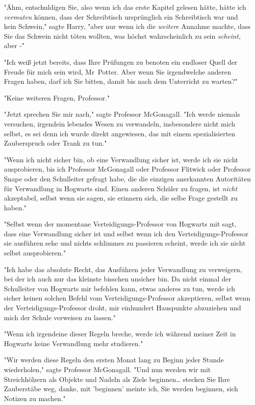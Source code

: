 {"Ähm, entschuldigen Sie, also wenn ich das erste Kapitel gelesen hätte, hätte ich \emph{vermuten} können, dass der Schreibtisch ursprünglich ein Schreibtisch war und kein Schwein," sagte Harry, "aber nur wenn ich die \emph{weitere} Annahme machte, dass Sie das Schwein nicht töten wollten, was höchst wahrscheinlich zu sein \emph{scheint,} aber -"

"Ich weiß jetzt bereits, dass Ihre Prüfungen zu benoten ein endloser Quell der Freude für mich sein wird, Mr~Potter. Aber wenn Sie irgendwelche anderen Fragen haben, darf ich Sie bitten, damit bis nach dem Unterricht zu warten?"

"Keine weiteren Fragen, Professor."

"Jetzt sprechen Sie mir nach," sagte Professor McGonagall. "Ich werde niemals versuchen, irgendein lebendes Wesen zu verwandeln, insbesondere nicht mich selbst, es sei denn ich wurde direkt angewiesen, das mit einem spezialisierten Zauberspruch oder Trank zu tun."

"Wenn ich nicht sicher bin, ob eine Verwandlung sicher ist, werde ich sie nicht ausprobieren, bis ich Professor McGonagall oder Professor Flitwick oder Professor Snape oder den Schulleiter gefragt habe, die die einzigen anerkannten Autoritäten für Verwandlung in Hogwarts sind. Einen anderen Schüler zu fragen, ist \emph{nicht} akzeptabel, selbst wenn sie sagen, sie erinnern sich, die selbe Frage gestellt zu haben."

"Selbst wenn der momentane Verteidigungs-Professor von Hogwarts mit sagt, dass eine Verwandlung sicher ist und selbst wenn ich den Verteidigungs-Professor sie ausführen sehe und nichts schlimmes zu passieren scheint, werde ich sie nicht selbst ausprobieren."

"Ich habe das absolute Recht, das Ausführen jeder Verwandlung zu verweigern, bei der ich auch nur das kleinste bisschen unsicher bin. Da nicht einmal der Schulleiter von Hogwarts mir befehlen kann, etwas anderes zu tun, werde ich sicher keinen solchen Befehl vom Verteidigungs-Professor akzeptieren, selbst wenn der Verteidigungs-Professor droht, mir einhundert Hauspunkte abzuziehen und mich der Schule verweisen zu lassen."

"Wenn ich irgendeine dieser Regeln breche, werde ich während meiner Zeit in Hogwarts keine Verwandlung mehr studieren."

"Wir werden diese Regeln den ersten Monat lang zu Beginn jeder Stunde wiederholen," sagte Professor McGonagall. "Und nun werden wir mit Streichhölzern als Objekte und Nadeln als Ziele beginnen… stecken Sie Ihre Zauberstäbe weg, danke, mit 'beginnen' meinte ich, Sie werden beginnen, sich Notizen zu machen."

}

